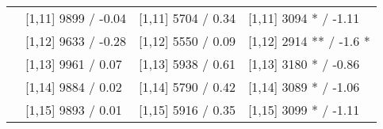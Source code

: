 \begin{table}
\begin{tabular}[t]{llll}
 & {}[1,11] 9899  / -0.04 & {}[1,11] 5704  / 0.34 & {}[1,11] 3094 * / -1.11\\
 & {}[1,12] 9633  / -0.28 & {}[1,12] 5550  / 0.09 & {}[1,12] 2914 ** / -1.6 *\\
\addlinespace
 & {}[1,13] 9961  / 0.07 & {}[1,13] 5938  / 0.61 & {}[1,13] 3180 * / -0.86\\
 & {}[1,14] 9884  / 0.02 & {}[1,14] 5790  / 0.42 & {}[1,14] 3089 * / -1.06\\
 & {}[1,15] 9893  / 0.01 & {}[1,15] 5916  / 0.35 & {}[1,15] 3099 * / -1.11\\
\bottomrule
\end{tabular}
\end{table}
